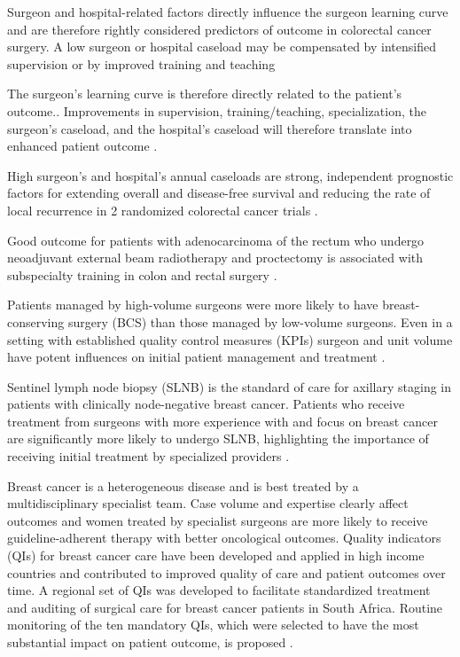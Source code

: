 Surgeon and hospital-related factors directly influence the surgeon learning curve and are therefore rightly considered predictors of outcome in colorectal cancer surgery. A low surgeon or hospital caseload may be compensated by intensified supervision or by improved training and teaching \cite{bonati_surgeon_2021}

The surgeon's learning curve is therefore directly related to the patient's outcome.. Improvements in supervision, training/teaching, specialization, the surgeon's caseload, and the hospital's caseload will therefore translate into enhanced patient outcome \cite{renzulli_learning_2005}.

High surgeon's and hospital's annual caseloads are strong, independent prognostic factors for extending overall and disease-free survival and reducing the rate of local recurrence in 2 randomized colorectal cancer trials \cite{renzulli_influence_2006}.

Good outcome for patients with adenocarcinoma of the rectum who undergo neoadjuvant external beam radiotherapy and proctectomy is associated with subspecialty training in colon and rectal surgery \cite{read_surgeon_2002}.

Patients managed by high-volume surgeons were more likely to have breast-conserving surgery (BCS) than those managed by low-volume surgeons. Even in a setting with established quality control measures (KPIs) surgeon and unit volume have potent influences on initial patient management and treatment \cite{mcdermott_surgeon_2013}.

Sentinel lymph node biopsy (SLNB) is the standard of care for axillary staging in patients with clinically node-negative breast cancer. Patients who receive treatment from surgeons with more experience with and focus on breast cancer are significantly more likely to undergo SLNB, highlighting the importance of receiving initial treatment by specialized providers \cite{yen_surgeon_2014}.

Breast cancer is a heterogeneous disease and is best treated by a multidisciplinary specialist team. Case volume and expertise clearly affect outcomes and women treated by specialist surgeons are more likely to receive guideline-adherent therapy with better oncological outcomes. Quality indicators (QIs) for breast cancer care have been developed and applied in high income countries and contributed to improved quality of care and patient outcomes over time. A regional set of QIs was developed to facilitate standardized treatment and auditing of surgical care for breast cancer patients in South Africa. Routine monitoring of the ten mandatory QIs, which were selected to have the most substantial impact on patient outcome, is proposed \cite{nietz_quality_2020}.


